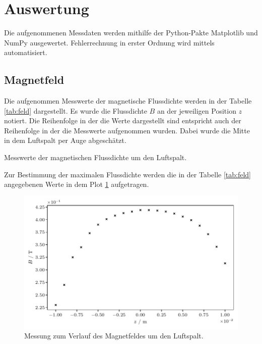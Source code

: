 \section{Auswertung}
\label{sec:auswertung}

Die aufgenommenen Messdaten werden mithilfe der Python-Pakte Matplotlib \cite{matplotlib} und NumPy \cite{numpy}
ausgewertet. Fehlerrechnung in erster Ordnung wird mittels \cite{uncertainties} automatisiert.

\subsection{Magnetfeld}

Die aufgenommen Messwerte der magnetische Flussdichte werden in der Tabelle \ref{tab:feld} dargestellt.
Es wurde die Flussdichte $B$ an der jeweiligen Position $z$ notiert.
Die Reihenfolge in der die Werte dargestellt sind entspricht auch der Reihenfolge in der die Messwerte aufgenommen wurden.
Dabei wurde die Mitte in dem Luftspalt per Auge abgeschätzt.

\begin{table}[H]
	\centering
	\caption{Messwerte der magnetischen Flussdichte um den Luftspalt.}
	
	\label{tab:feld}
\end{table}

Zur Bestimmung der maximalen Flussdichte werden die in der Tabelle \ref{tab:feld} angegebenen Werte in dem
Plot \ref{fig:feld} aufgetragen.

\begin{figure}[H]
    \centering
    \includegraphics{build/field.pdf}
    \caption{Messung zum Verlauf des Magnetfeldes um den Luftspalt.}
    \label{fig:feld}
\end{figure}

